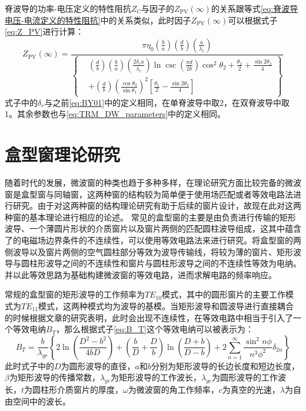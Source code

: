 \documentclass[master]{thesis-uestc}
\begin{document}
脊波导的功率-电压定义的特性阻抗\(Z_C\)与因子的\(Z_{\mathrm{PV}}(\infty)\)的关系跟等式\ref{eq:脊波导电压-电流定义的特性阻抗}中的关系类似，此时因子\(Z_{\mathrm{PV}}(\infty)\)可以根据式子\ref{eq:Z_PV}进行计算：
\begin{equation}\label{eq:Z_PV}
    Z_{\mathrm{PV}}(\infty) = \frac{\pi \eta_0 \left( \frac{b}{a} \right) \left( \frac{d}{b} \right) \left( \frac{a}{\lambda_c} \right)}{
        \left\{ 
            \begin{aligned}
                & \left( \frac{d}{b} \right) \left( \frac{b}{a} \right) \left( \frac{2 \delta_r a}{\lambda_c} \right) \ln \csc \left( \frac{\pi d}{2b} \right) \cos^2 \theta_2 + \frac{\theta_2}{2} + \frac{\sin 2\theta_2}{4} \\
                & + \left( \frac{d}{b} \right) \left( \frac{\cos \theta_2}{\sin \theta_1} \right)^2 \left[ \frac{\theta_1}{2} - \frac{\sin 2\theta_1}{4} \right]
            \end{aligned}
        \right\}
    }
\end{equation}
式子中的$\delta_{r}$与之前\ref{eq:BY01}中的定义相同，在单脊波导中取2，在双脊波导中取1。其余参数也与\ref{eq:TRM_DW_parameters}中的定义相同。

\section{盒型窗理论研究}\label{sec:PillBoxTheory}
随着时代的发展，微波窗的种类也趋于多种多样，在理论研究方面比较完备的微波窗是盒型窗与同轴窗，这两种窗的结构较为简单便于使用场匹配或者等效电路法进行研究。由于对这两种窗的结构理论研究有助于后续的窗片设计，故现在此对这两种窗的基本理论进行相应的论述。
常见的盒型窗的主要是由负责进行传输的矩形波导、一个薄圆片形状的介质窗片以及窗片两侧的匹配圆柱波导组成，这其中蕴含了的电磁场边界条件的不连续性，可以使用等效电路法来进行研究。将盒型窗的两侧波导以及窗片两侧的空气圆柱部分等效为波导传输线，将较为薄的窗片、矩形波导与圆柱形波导之间的不连续性和窗片与圆柱形波导之间的不连续性等效为电纳。并以此等效思路为基础构建微波窗的等效电路，进而求解电路的频率响应。

常规的盒型窗的矩形波导的工作频率为$TE_{10}$模式，其中的圆形窗片的主要工作模式为$TE_{11}$模式，这两种模式均为波导的基模。当矩形波导和圆波导进行直接耦合的时候根据文章的研究表明，此时会出现不连续性，在等效电路中相当于引入了一个等效电纳$B_{T}$，那么根据式子\ref{eq:B_T}这个等效电纳可以被表示为：
\begin{equation}\label{eq:B_T}
    B_{T}=\frac{b}{\lambda_{g r}}\left\{2 \ln \left(\frac{D^{2}-b^{2}}{4 b D}\right)+\left(\frac{b}{D}+\frac{D}{b}\right) \ln \left(\frac{D+b}{D-b}\right)+2 \sum_{n=1}^{\infty} \frac{\sin ^{2} n \phi}{n^{3} \phi^{2}} \delta_{2 n}\right\}
\end{equation}
此时式子中的$D$为圆形波导的直径，$a$和$b$分别为矩形波导的长边长度和短边长度，$\beta$为矩形波导的传播常数，$\lambda_{g r}$为矩形波导的工作波长，$\lambda_{g c}$为圆形波导的工作波长，$t$为圆柱形介质窗片的厚度，$\omega$为微波窗的角工作频率，$c$为真空的光速，$\lambda$为自由空间中的波长。
\end{document}
